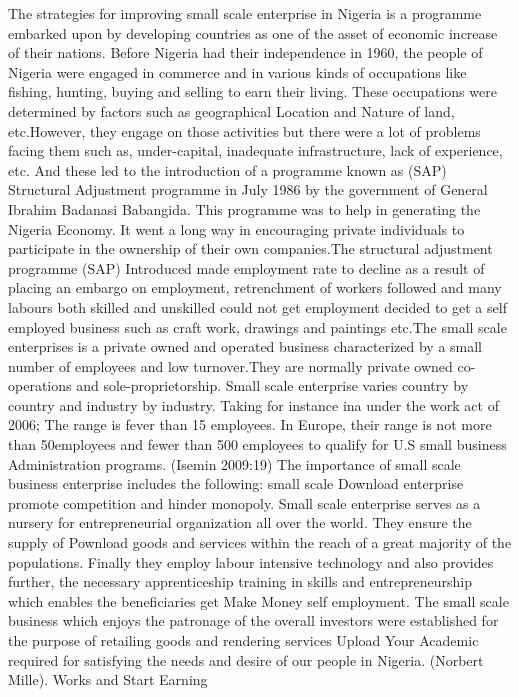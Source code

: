 \documentclass{article}
\begin{document}
The strategies for improving small scale enterprise in Nigeria is a programme embarked
upon by developing countries as one of the asset of economic increase of their nations.
Before Nigeria had their independence in 1960, the people of Nigeria were engaged in
commerce and in various kinds of occupations like fishing, hunting, buying and selling to
earn their living. These occupations were determined by factors such as geographical
Location and Nature of land, etc.However, they engage on those activities but there were a lot of problems facing them
such as, under-capital, inadequate infrastructure, lack of experience, etc. And these led to
the introduction of a programme known as (SAP) Structural Adjustment programme in
July 1986 by the government of General Ibrahim Badanasi Babangida. This programme
was to help in generating the Nigeria Economy. It went a long way in encouraging private
individuals to participate in the ownership of their own companies.The structural adjustment programme (SAP) Introduced made employment rate to decline
as a result of placing an embargo on employment, retrenchment of workers followed and
many labours both skilled and unskilled could not get employment decided to get a self
employed business such as craft work, drawings and paintings etc.The small scale enterprises is a private owned and operated business characterized by a
small number of employees and low turnover.They are normally private owned co-operations and sole-proprietorship. Small scale
enterprise varies country by country and industry by industry. Taking for instance ina under the work act of 2006; The range is fever than 15 employees. In Europe,
their range is not more than 50employees and fewer than 500 employees to qualify for
U.S small business Administration programs. (Isemin 2009:19) The importance of small scale business enterprise includes the following: small scale Download
enterprise promote competition and hinder monopoly. Small scale enterprise serves as a
nursery for entrepreneurial organization all over the world. They ensure the supply of Pownload
goods and services within the reach of a great majority of the populations. Finally they
employ labour intensive technology and also provides further, the necessary
apprenticeship training in skills and entrepreneurship which enables the beneficiaries get Make Money
self employment. The small scale business which enjoys the patronage of the overall investors were established for the purpose of retailing goods and rendering services Upload Your Academic
required for satisfying the needs and desire of our people in Nigeria. (Norbert Mille). Works and Start Earning
\end{document}
